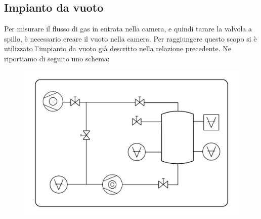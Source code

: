 \documentclass[11pt]{article}
\begin{document}
\subsection{Impianto da vuoto}
Per misurare il flusso di gas in entrata nella camera, e quindi tarare la valvola a spillo, è necessario creare il vuoto nella camera. Per raggiungere questo scopo si è utilizzato l'impianto da vuoto già descritto nella relazione precedente. Ne riportiamo di seguito uno schema:
\vspace{-10 pt} 
 \begin{center} 
\begin{figure}[H]
\hspace{-30.5pt}
\includegraphics[scale=0.4]{schema_finale.png}
\caption{}
\label{}
\end{figure}
\end{center}
\end{document}
